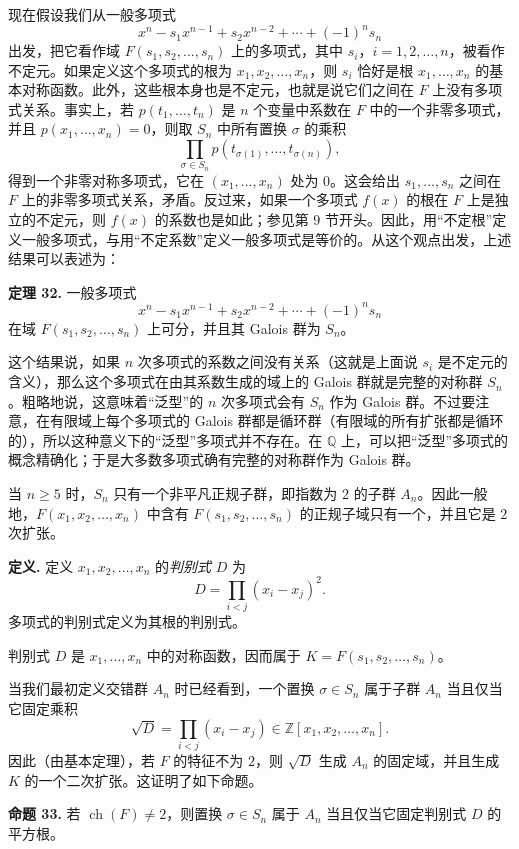 现在假设我们从一般多项式
\[
x^n-s_1x^{n-1}+s_2x^{n-2}+\cdots+(-1)^n s_n
\]
出发，把它看作域 $F(s_1,s_2,\ldots,s_n)$ 上的多项式，其中 $s_i$，$i=1,2,\ldots,n$，被看作不定元。如果定义这个多项式的根为 $x_1,x_2,\ldots,x_n$，则 $s_i$ 恰好是根 $x_1,\ldots,x_n$ 的基本对称函数。此外，这些根本身也是不定元，也就是说它们之间在 $F$ 上没有多项式关系。事实上，若 $p(t_1,\ldots,t_n)$ 是 $n$ 个变量中系数在 $F$ 中的一个非零多项式，并且 $p(x_1,\ldots,x_n)=0$，则取 $S_n$ 中所有置换 $\sigma$ 的乘积
\[
\prod_{\sigma\in S_n}p(t_{\sigma(1)},\ldots,t_{\sigma(n)}),
\]
得到一个非零对称多项式，它在 $(x_1,
\ldots,x_n)$ 处为 $0$。这会给出 $s_1,\ldots,s_n$ 之间在 $F$ 上的非零多项式关系，矛盾。反过来，如果一个多项式 $f(x)$ 的根在 $F$ 上是独立的不定元，则 $f(x)$ 的系数也是如此；参见第 9 节开头。因此，用“不定根”定义一般多项式，与用“不定系数”定义一般多项式是等价的。从这个观点出发，上述结果可以表述为：

\noindent\textbf{定理 32.} 一般多项式
\[
x^n-s_1x^{n-1}+s_2x^{n-2}+\cdots+(-1)^n s_n
\]
在域 $F(s_1,s_2,\ldots,s_n)$ 上可分，并且其 Galois 群为 $S_n$。

这个结果说，如果 $n$ 次多项式的系数之间没有关系（这就是上面说 $s_i$ 是不定元的含义），那么这个多项式在由其系数生成的域上的 Galois 群就是完整的对称群 $S_n$。粗略地说，这意味着“泛型”的 $n$ 次多项式会有 $S_n$ 作为 Galois 群。不过要注意，在有限域上每个多项式的 Galois 群都是循环群（有限域的所有扩张都是循环的），所以这种意义下的“泛型”多项式并不存在。在 $\mathbb Q$ 上，可以把“泛型”多项式的概念精确化；于是大多数多项式确有完整的对称群作为 Galois 群。

当 $n\geq 5$ 时，$S_n$ 只有一个非平凡正规子群，即指数为 $2$ 的子群 $A_n$。因此一般地，$F(x_1,x_2,\ldots,x_n)$ 中含有 $F(s_1,s_2,\ldots,s_n)$ 的正规子域只有一个，并且它是 $2$ 次扩张。

\noindent\textbf{定义.} 定义 $x_1,x_2,\ldots,x_n$ 的\emph{判别式} $D$ 为
\[
D=\prod_{i<j}(x_i-x_j)^2.
\]
多项式的判别式定义为其根的判别式。

判别式 $D$ 是 $x_1,
\ldots,x_n$ 中的对称函数，因而属于 $K=F(s_1,s_2,\ldots,s_n)$。

当我们最初定义交错群 $A_n$ 时已经看到，一个置换 $\sigma\in S_n$ 属于子群 $A_n$ 当且仅当它固定乘积
\[
\sqrt D=\prod_{i<j}(x_i-x_j)\in \mathbb Z[x_1,x_2,\ldots,x_n].
\]
因此（由基本定理），若 $F$ 的特征不为 $2$，则 $\sqrt D$ 生成 $A_n$ 的固定域，并且生成 $K$ 的一个二次扩张。这证明了如下命题。

\noindent\textbf{命题 33.} 若 $\operatorname{ch}(F)\neq 2$，则置换 $\sigma\in S_n$ 属于 $A_n$ 当且仅当它固定判别式 $D$ 的平方根。

